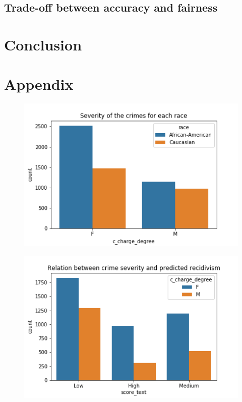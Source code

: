 \documentclass[11pt, fleqn, titlepage]{article}
\begin{document}
	\subsection{Trade-off between accuracy and fairness}
	
	
	\section{Conclusion} \label{conclusion}
	
	\section{Appendix} \label{appendix}
	
	\begin{figure}[H]
		\centering
		\includegraphics[width=0.5\linewidth]{imgs/c_charge_degree}
		\caption{}
		\label{fig:cchargedegree}
	\end{figure}
	
	\begin{figure}[H]
		\centering
		\includegraphics[width=0.5\linewidth]{imgs/charge_degree_score}
		\caption{}
		\label{fig:chargedegreescore}
	\end{figure}
	
\end{document}

